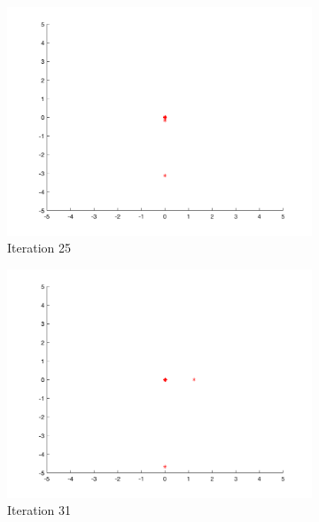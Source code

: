 \begin{figure}
\begin{subfigure}[b]{0.4\textwidth}
    \includegraphics[width=\textwidth]{img/smpl/sphr/loa-iter-25}
    \caption{Iteration 25}
    \label{fig:s2-iter-4}
  \end{subfigure}
  \begin{subfigure}[b]{0.4\textwidth}
    \includegraphics[width=\textwidth]{img/smpl/sphr/loa-iter-31}
    \caption{Iteration 31}
    \label{fig:s2-iter-5}
  \end{subfigure}
  \begin{subfigure}[b]{0.4\textwidth}

\end{subfigure}
\end{figure}
